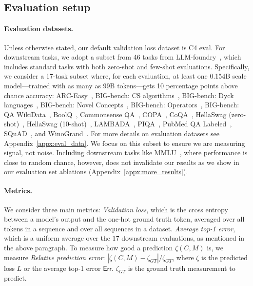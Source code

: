 \subsection{Evaluation setup}
\label{sec:evaluation}

\paragraph{Evaluation datasets.}
Unless otherwise stated, our default validation loss dataset is C4 eval.
For downstream tasks, we adopt a subset from 46 tasks from LLM-foundry~\cite{mosaicml}, which includes standard tasks with both zero-shot and few-shot evaluations.
Specifically, we consider a 17-task subset where, for each evaluation, at least one 0.154B scale model---trained with as many as 99B tokens---gets 10 percentage points above chance accuracy:
ARC-Easy~\cite{arc},
BIG-bench: CS algorithms~\cite{srivastava2023beyond},
BIG-bench: Dyck languages~\cite{srivastava2023beyond},
BIG-bench: Novel Concepts~\cite{srivastava2023beyond},
BIG-bench: Operators~\cite{srivastava2023beyond},
BIG-bench: QA WikiData~\cite{srivastava2023beyond},
BoolQ~\cite{boolq},
Commonsense QA~\cite{talmor-etal-2019-commonsenseqa},
COPA~\cite{copa},
CoQA~\cite{reddy-etal-2019-coqa},
HellaSwag (zero-shot)~\cite{hellaswag},
HellaSwag (10-shot)~\cite{hellaswag},
LAMBADA~\cite{lambada},
PIQA~\cite{piqa},
PubMed QA Labeled~\cite{pubmed},
SQuAD~\cite{squad},
and
WinoGrand~\cite{winograd}.
For more details on evaluation datasets see Appendix~\ref{appx:eval_data}.
We focus on this subset to ensure we are measuring signal, not noise.
Including downstream tasks like MMLU~\cite{mmlu}, where performance is close to random chance, however, does not invalidate our results as we show in our evaluation set ablations (Appendix~\ref{appx:more_results}).

\paragraph{Metrics.}
We consider three main metrics:
\emph{Validation loss}, which is the cross entropy between a model's output and the one-hot ground truth token, averaged over all tokens in a sequence and over all sequences in a dataset.
\emph{Average top-1 error}, which is a uniform average over the 17 downstream evaluations, as mentioned in the above paragraph.
To measure how good a prediction $\zeta(C, M)$ is, we measure \emph{Relative prediction error}: $|\zeta(C, M) - \zeta_{GT}| / \zeta_{GT}$, where $\zeta$ is the predicted loss $L$ or the average top-1 error $\textsf{Err}$. $\zeta_{GT}$ is the ground truth measurement to predict.

